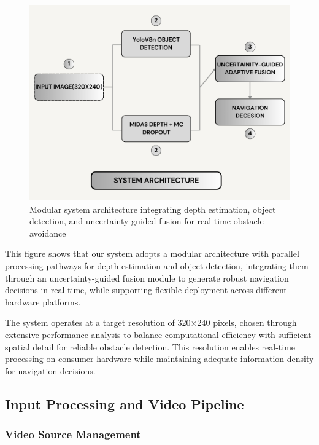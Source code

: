 \documentclass[12pt,oneside]{book}
\begin{document}
\begin{figure}[p]
\centering
\includegraphics[width=1\textwidth,height=0.85\textheight,keepaspectratio]{system_architecture.png}
\vspace{1cm}
\caption{Modular system architecture integrating depth estimation, object detection, and uncertainty-guided fusion for real-time obstacle avoidance}
\label{fig:architecture}
\end{figure}

This figure shows that our system adopts a modular architecture with parallel processing pathways for depth estimation and object detection, integrating them through an uncertainty-guided fusion module to generate robust navigation decisions in real-time, while supporting flexible deployment across different hardware platforms.

The system operates at a target resolution of 320$\times$240 pixels, chosen through extensive performance analysis to balance computational efficiency with sufficient spatial detail for reliable obstacle detection. This resolution enables real-time processing on consumer hardware while maintaining adequate information density for navigation decisions.

\subsection{Input Processing and Video Pipeline}

\subsubsection{Video Source Management}
\end{document}
